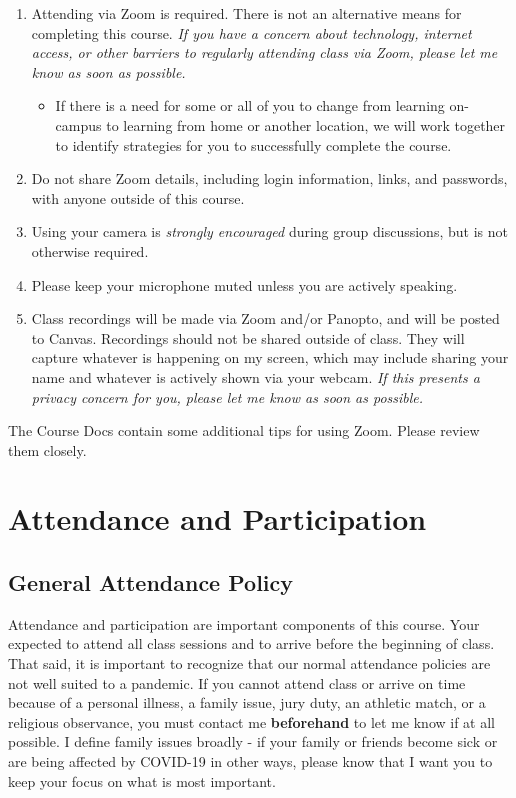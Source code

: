 \documentclass[
]{book}
\providecommand{\tightlist}{%
  \setlength{\itemsep}{0pt}\setlength{\parskip}{0pt}}
\begin{document}
\begin{enumerate}
\def\labelenumi{\arabic{enumi}.}
\tightlist
\item
  Attending via Zoom is required. There is not an alternative means for completing this course. \emph{If you have a concern about technology, internet access, or other barriers to regularly attending class via Zoom, please let me know as soon as possible.}

  \begin{itemize}
  \tightlist
  \item
    If there is a need for some or all of you to change from learning on-campus to learning from home or another location, we will work together to identify strategies for you to successfully complete the course.
  \end{itemize}
\item
  Do not share Zoom details, including login information, links, and passwords, with anyone outside of this course.
\item
  Using your camera is \emph{strongly encouraged} during group discussions, but is not otherwise required.
\item
  Please keep your microphone muted unless you are actively speaking.
\item
  Class recordings will be made via Zoom and/or Panopto, and will be posted to Canvas. Recordings should not be shared outside of class. They will capture whatever is happening on my screen, which may include sharing your name and whatever is actively shown via your webcam. \emph{If this presents a privacy concern for you, please let me know as soon as possible.}
\end{enumerate}

The Course Docs contain some additional tips for using Zoom. Please review them closely.

\hypertarget{attendance-and-participation}{%
\section{Attendance and Participation}\label{attendance-and-participation}}

\hypertarget{general-attendance-policy}{%
\subsection{General Attendance Policy}\label{general-attendance-policy}}

Attendance and participation are important components of this course. Your expected to attend all class sessions and to arrive before the beginning of class. That said, it is important to recognize that our normal attendance policies are not well suited to a pandemic. If you cannot attend class or arrive on time because of a personal illness, a family issue, jury duty, an athletic match, or a religious observance, you must contact me \textbf{beforehand} to let me know if at all possible. I define family issues broadly - if your family or friends become sick or are being affected by COVID-19 in other ways, please know that I want you to keep your focus on what is most important.
\end{document}
